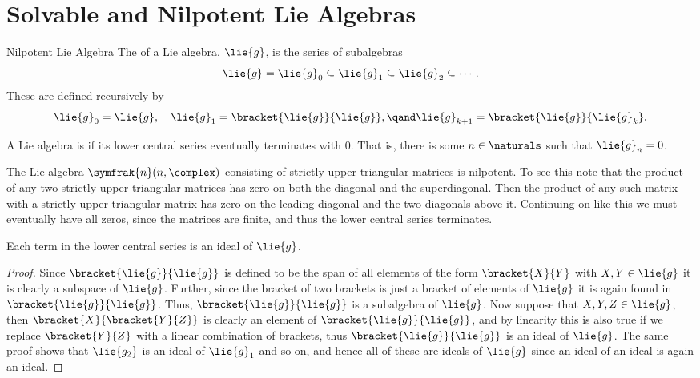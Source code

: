 \documentclass[fleqn]{NotesClass}
\newcommand{\nilpotentLie}{\symfrak{n}}
\begin{document}
    \section{Solvable and Nilpotent Lie Algebras}
    \begin{dfn}{Nilpotent Lie Algebra}{}
        The  of a Lie algebra, \(\lie{g}\), is the series of subalgebras
        \begin{equation}
            \lie{g} = \lie{g}_0 \subseteq \lie{g}_1 \subseteq \lie{g}_2 \subseteq \dotsb.
        \end{equation}
        These are defined recursively by
        \begin{equation}
            \lie{g}_0 = \lie{g}, \quad \lie{g}_1 = \bracket{\lie{g}}{\lie{g}}, \qand \lie{g}_{k+1} = \bracket{\lie{g}}{\lie{g}_k}.
        \end{equation}
        
        A Lie algebra is  if its lower central series eventually terminates with \(0\).
        That is, there is some \(n \in \naturals\) such that \(\lie{g}_n = 0\).
    \end{dfn}
    
    \begin{exm}{}{}
        The Lie algebra \(\nilpotentLie(n, \complex)\) consisting of strictly upper triangular matrices is nilpotent.
        To see this note that the product of any two strictly upper triangular matrices has zero on both the diagonal and the superdiagonal.
        Then the product of any such matrix with a strictly upper triangular matrix has zero on the leading diagonal and the two diagonals above it.
        Continuing on like this we must eventually have all zeros, since the matrices are finite, and thus the lower central series terminates.
    \end{exm}
    
    \begin{lma}{}{}
        Each term in the lower central series is an ideal of \(\lie{g}\).
        \begin{proof}
            Since \(\bracket{\lie{g}}{\lie{g}}\) is defined to be the span of all elements of the form \(\bracket{X}{Y}\) with \(X, Y \in \lie{g}\) it is clearly a subspace of \(\lie{g}\).
            Further, since the bracket of two brackets is just a bracket of elements of \(\lie{g}\) it is again found in \(\bracket{\lie{g}}{\lie{g}}\).
            Thus, \(\bracket{\lie{g}}{\lie{g}}\) is a subalgebra of \(\lie{g}\).
            Now suppose that \(X, Y, Z \in \lie{g}\), then \(\bracket{X}{\bracket{Y}{Z}}\) is clearly an element of \(\bracket{\lie{g}}{\lie{g}}\), and by linearity this is also true if we replace \(\bracket{Y}{Z}\) with a linear combination of brackets, thus \(\bracket{\lie{g}}{\lie{g}}\) is an ideal of \(\lie{g}\).
            The same proof shows that \(\lie{g_2}\) is an ideal of \(\lie{g}_1\) and so on, and hence all of these are ideals of \(\lie{g}\) since an ideal of an ideal is again an ideal.
        \end{proof}
    \end{lma}
    
\end{document}
